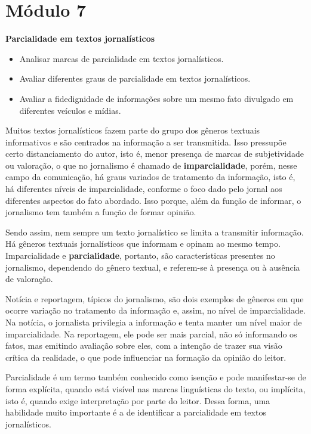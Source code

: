 \section{Módulo 7}

\textbf{Parcialidade em textos jornalísticos}


\begin{itemize}
\tightlist
\item
  Analisar marcas de parcialidade em textos jornalísticos.
\item
  Avaliar diferentes graus de parcialidade em textos jornalísticos.
\item
  Avaliar a fidedignidade de informações sobre um mesmo fato divulgado
  em diferentes veículos e mídias.
\end{itemize}

Muitos textos jornalísticos fazem parte do grupo dos gêneros textuais
informativos e são centrados na informação a ser transmitida. Isso
pressupõe certo distanciamento do autor, isto é, menor presença de
marcas de subjetividade ou valoração, o que no jornalismo é chamado de
\textbf{imparcialidade}, porém, nesse campo da comunicação, há graus
variados de tratamento da informação, isto é, há diferentes níveis de
imparcialidade, conforme o foco dado pelo jornal aos diferentes aspectos
do fato abordado. Isso porque, além da função de informar, o jornalismo
tem também a função de formar opinião.

Sendo assim, nem sempre um texto jornalístico se limita a transmitir
informação. Há gêneros textuais jornalísticos que informam e opinam ao
mesmo tempo. Imparcialidade e \textbf{parcialidade}, portanto, são
características presentes no jornalismo, dependendo do gênero textual, e
referem-se à presença ou à ausência de valoração.

Notícia e reportagem, típicos do jornalismo, são dois exemplos de
gêneros em que ocorre variação no tratamento da informação e, assim, no
nível de imparcialidade. Na notícia, o jornalista privilegia a
informação e tenta manter um nível maior de imparcialidade. Na
reportagem, ele pode ser mais parcial, não só informando os fatos, mas
emitindo avaliação sobre eles, com a intenção de trazer sua visão
crítica da realidade, o que pode influenciar na formação da opinião do
leitor.

Parcialidade é um termo também conhecido como isenção e pode
manifestar-se de forma explícita, quando está visível nas marcas
linguísticas do texto, ou implícita, isto é, quando exige interpretação
por parte do leitor. Dessa forma, uma habilidade muito importante é a de
identificar a parcialidade em textos jornalísticos.

